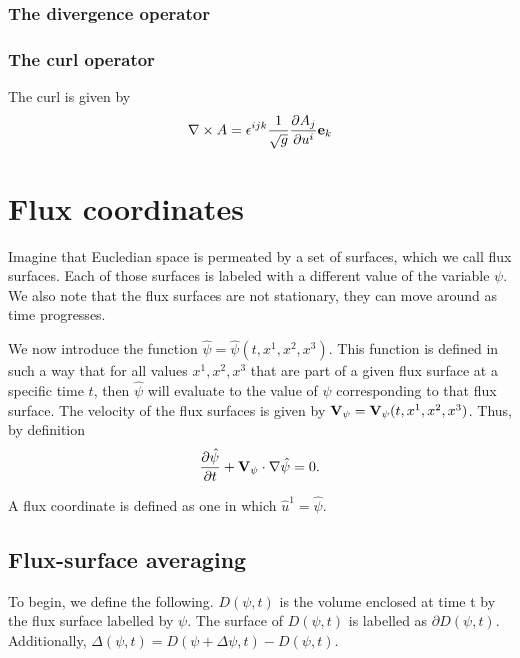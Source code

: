 \documentclass[11pt]{article}
\begin{document}
\subsubsection{The divergence operator}

\subsubsection{The curl operator}
The curl is given by
\begin{equation}
    \nabla \times A = \epsilon^{ijk} \frac{1}{\sqrt{g}} \frac{\partial A_j}{\partial u^i} \mathbf{e}_k
\end{equation}

\section{Flux coordinates}
Imagine that Eucledian space is permeated by a set of surfaces, which we call flux surfaces. Each of those surfaces is labeled with a different value of the variable $\psi$. We also note that the flux surfaces are not stationary, they can move around as time progresses.

We now introduce the function $\hat{\psi} = \hat{\psi}(t,x^1,x^2,x^3)$. This function is defined in such a way that for all values $x^1,x^2,x^3$ that are part of a given flux surface at a specific time $t$, then $\hat{\psi}$ will evaluate to the value of $\psi$ corresponding to that flux surface. The velocity of the flux surfaces is given by $\mathbf{V}_\psi = \mathbf{V}_\psi(t,x^1,x^2,x^3)$. Thus, by definition
\begin{equation}
\label{eq:cons_flux_surf}
    \frac{\partial \hat{\psi}}{\partial t} + \mathbf{V}_\psi \cdot \nabla \hat{\psi} = 0.
\end{equation}

A flux coordinate is defined as one in which $\hat{u}^1 = \hat{\psi}$.


\subsection{Flux-surface averaging}
To begin, we define the following. $D(\psi,t)$ is the volume enclosed at time t by the flux surface labelled by $\psi$. The surface of $D(\psi,t)$ is labelled as $\partial D(\psi,t)$. Additionally, $\Delta(\psi,t) = D(\psi + \Delta \psi,t) - D(\psi,t)$.
\end{document}
